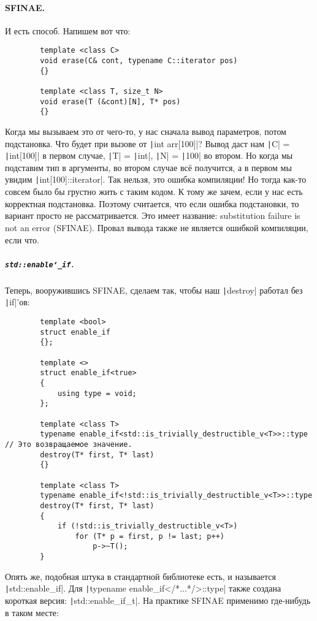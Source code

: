 \documentclass{article}
\begin{document}
    \paragraph{SFINAE.}
    И есть способ. Напишем вот что:
    \begin{verbatim}
        template <class C>
        void erase(C& cont, typename C::iterator pos)
        {}

        template <class T, size_t N>
        void erase(T (&cont)[N], T* pos)
        {}
    \end{verbatim}
    Когда мы вызываем это от чего-то, у нас сначала вывод параметров, потом подстановка. Что будет при вызове от \texttt|int arr[100]|? Вывод даст нам \texttt|C| = \texttt|int[100]| в первом случае, \texttt|T| = \texttt|int|, \texttt|N| = \texttt|100| во втором. Но когда мы подставим тип в аргументы, во втором случае всё получится, а в первом мы увидим \texttt|int[100]::iterator|. Так нельзя, это ошибка компиляции! Но тогда как-то совсем было бы грустно жить с таким кодом. К тому же зачем, если у нас есть корректная подстановка. Поэтому считается, что если ошибка подстановки, то вариант просто не рассматривается. Это имеет название: substitution failure is not an error (SFINAE). Провал вывода также не является ошибкой компиляции, если что.
    \subparagraph{\texttt{std::enable\char`_if}.}
    Теперь, вооружившись SFINAE, сделаем так, чтобы наш \texttt|destroy| работал без \texttt|if|'ов:
    \begin{verbatim}
        template <bool>
        struct enable_if
        {};

        template <>
        struct enable_if<true>
        {
            using type = void;
        };

        template <class T>
        typename enable_if<std::is_trivially_destructible_v<T>>::type // Это возвращаемое значение.
        destroy(T* first, T* last)
        {}

        template <class T>
        typename enable_if<!std::is_trivially_destructible_v<T>>::type
        destroy(T* first, T* last)
        {
            if (!std::is_trivially_destructible_v<T>)
                for (T* p = first, p != last; p++)
                    p->~T();
        }
    \end{verbatim}
    Опять же, подобная штука в стандартной библиотеке есть, и называется \texttt|std::enable_if|. Для \texttt|typename enable_if</*...*/>::type| также создана короткая версия: \texttt|std::enable_if_t|. На практике SFINAE применимо где-нибудь в таком месте:
\end{document}
